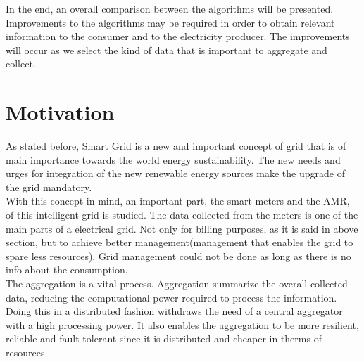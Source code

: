 In the end, an overall comparison between the algorithms will be presented. Improvements to the algorithms may be required in order to obtain relevant information to the consumer and to the electricity producer. The improvements will occur as we select the kind of data that is important to aggregate and collect.

\section{Motivation}
As stated before, Smart Grid is a new and important concept of grid that is of main importance towards the world energy sustainability.  The new needs and urges for integration of the new renewable energy sources make the upgrade of the grid mandatory.\\
With this concept in mind, an important part, the smart meters and the AMR, of this intelligent grid is studied. The data collected from the meters is one of the main parts of a electrical grid. Not only for billing purposes, as it is said in above section, but to achieve better management(management that enables the grid to spare less resources). Grid management could not be done as long as there is no info about the consumption.\\
The aggregation is a vital process. Aggregation summarize the overall collected data, reducing the computational power required to process the information. Doing this in a distributed fashion withdraws the need of a central aggregator with a high processing power. It also enables the aggregation to be more resilient, reliable and fault tolerant since it is distributed and  cheaper in therms of resources.


